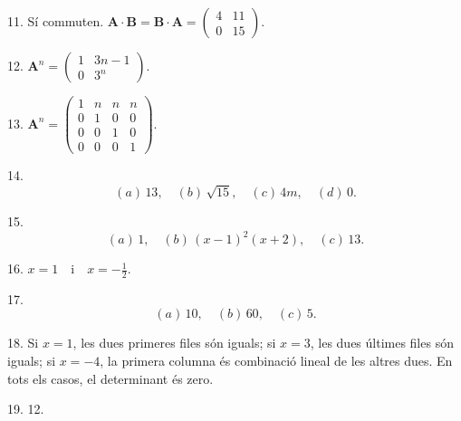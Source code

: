 \documentclass[12pt]{article}
\newcommand{\mat}[1]{\mathbf{#1}}
\begin{document}
\begin{exercici}
11. Sí commuten. $\mat{A} \cdot \mat{B} = \mat{B} \cdot \mat{A} = 
\begin{pmatrix}
4 & 11 \\
0 & 15
\end{pmatrix}$.
\end{exercici}

\begin{exercici}
12. $\mat{A}^n = 
\begin{pmatrix}
1 & 3n - 1 \\
0 & 3^n
\end{pmatrix}$.
\end{exercici}

\begin{exercici}
13. $\mat{A}^n = 
\begin{pmatrix}
1 & n & n & n \\
0 & 1 & 0 & 0 \\
0 & 0 & 1 & 0 \\
0 & 0 & 0 & 1
\end{pmatrix}$.
\end{exercici}

\begin{exercici}
14. 
\[
(a) \, 13, \quad 
(b) \, \sqrt{15}, \quad 
(c) \, 4m, \quad 
(d) \, 0.
\]
\end{exercici}

\begin{exercici}
15. 
\[
(a) \, 1, \quad 
(b) \, (x - 1)^2 (x + 2), \quad 
(c) \, 13.
\]
\end{exercici}

\begin{exercici}
16. $x = 1 \quad \text{i} \quad x = -\frac{1}{2}$.
\end{exercici}

\begin{exercici}
17. 
\[
(a) \, 10, \quad 
(b) \, 60, \quad 
(c) \, 5.
\]
\end{exercici}

\begin{exercici}
18. Si $x = 1$, les dues primeres files són iguals; si $x = 3$, les dues últimes files són iguals; si $x = -4$, la primera columna és combinació lineal de les altres dues. En tots els casos, el determinant és zero.
\end{exercici}

\begin{exercici}
19. 12.
\end{exercici}
\end{document}

